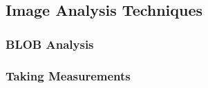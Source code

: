 \subsection{Image Analysis Techniques}
	\subsubsection{BLOB Analysis}
	\subsubsection{Taking Measurements}